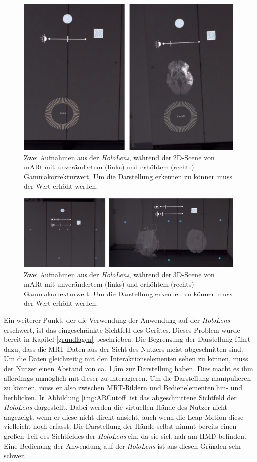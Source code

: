 \begin{figure}[!htb]
	\centering
	\includegraphics[width=0.7\linewidth]{images/mARt_AR_brightness.png}
	\caption{Zwei Aufnahmen aus der \textit{HoloLens}, während der 2D-Scene von mARt mit unverändertem (links) und erhöhtem (rechts) Gammakorrekturwert. Um die Darstellung erkennen zu können muss der Wert erhöht werden.}
	\label{img:ARLicht}
\end{figure}
\FloatBarrier

\begin{figure}[!htb]
	\centering
	\includegraphics[width=0.9\linewidth]{images/mARt_AR_brightness_3D.png}
	\caption{Zwei Aufnahmen aus der \textit{HoloLens}, während der 3D-Scene von mARt mit unverändertem (links) und erhöhtem (rechts) Gammakorrekturwert. Um die Darstellung erkennen zu können muss der Wert erhöht werden.}
	\label{img:ARLicht3D}
\end{figure}
\FloatBarrier

Ein weiterer Punkt, der die Verwendung der Anwendung auf der \textit{HoloLens} erschwert, ist das eingeschränkte Sichtfeld des Gerätes. Dieses Problem wurde bereit in Kapitel \ref{grundlagen} beschrieben. 
Die Begrenzung der Darstellung führt dazu, dass die MRT-Daten aus der Sicht des Nutzers meist abgeschnitten sind. Um die Daten gleichzeitig mit den Interaktionselementen sehen zu können, muss der Nutzer einen Abstand von ca. 1,5m zur Darstellung haben. Dies macht es ihm allerdings unmöglich mit dieser zu interagieren. Um die Darstellung manipulieren zu können, muss er also zwischen MRT-Bildern und Bedienelementen hin- und herblicken. In Abbildung \ref{img:ARCutoff} ist das abgeschnittene Sichtfeld der \textit{HoloLens} dargestellt. Dabei werden die virtuellen Hände des Nutzer nicht angezeigt, wenn er diese nicht direkt ansieht, auch wenn die Leap Motion diese vielleicht noch erfasst. 
Die Darstellung der Hände selbst nimmt bereits einen großen Teil des Sichtfeldes der \textit{HoloLens} ein, da sie sich nah am HMD befinden. 
Eine Bedienung der Anwendung auf der \textit{HoloLens} ist aus diesen Gründen sehr schwer. 

